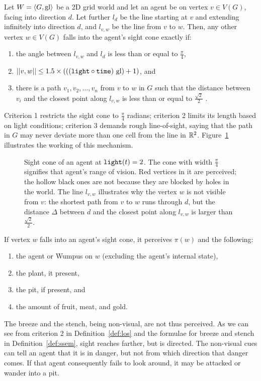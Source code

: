 \begin{definition}
	\label{def:los}
	Let $W = \langle G, \mathrm{gl} \rangle$ be a 2D grid world and let an agent be on vertex $v \in V(G)$, facing into direction $d$. Let further $l_d$ be the line starting at $v$ and extending infinitely into direction $d$, and $l_{v,w}$ be the line from $v$ to $w$. Then, any other vertex $w \in V(G)$ falls into the agent's sight cone exactly if:
	\begin{enumerate}
		\item the angle between $l_{v,w}$ and $l_d$ is less than or equal to $ \frac{\pi}{4}$,
		\item $||{v},{w}|| \leq 1.5 \times (((\mathtt{light} \circ \mathtt{time})\ \mathrm{gl}) + 1)$, and
		\item there is a path $v_1, v_2, \dots, v_n$ from $v$ to $w$ in $G$ such that
		the distance between $v_i$ and the closest point along $l_{v,w}$ is less than or equal to $ \frac{\sqrt{2}}{2}$ .
	\end{enumerate}
\end{definition}

Criterion 1 restricts the sight cone to $\frac{\pi}{4}$ radians; criterion 2 limits its length based on light conditions; criterion 3 demands rough line-of-sight, saying that the path in $G$ may never deviate more than one cell from the line in $\mathbb{R}^2$. Figure~\ref{fig:los} illustrates the working of this mechanism.
%
\begin{figure}
	\centering
	
	\caption{Sight cone of an agent at $\mathtt{light}(t) = 2$. The cone with width $\frac{\pi}{4}$ signifies that agent's range of vision. Red vertices in it are perceived; the hollow black ones are not because they are blocked by holes in the world. The line $l_{v,w}$ illustrates why the vertex $w$ is not visible from $v$: the shortest path from $v$ to $w$ runs through $d$, but the distance $\Delta$ between $d$ and the closest point along $l_{v,w}$ is larger than $\frac{\sqrt{2}}{2}$.}
	\label{fig:los}
\end{figure}
%
If vertex $w$ falls into an agent's sight cone, it perceives $\pi(w)$ and the following:
\begin{enumerate}
	\item the agent or Wumpus on $w$ (excluding the agent's internal state),
	\item the plant, it present,
	\item the pit, if present, and
	\item the amount of fruit, meat, and gold.
\end{enumerate}
The breeze and the stench, being non-visual, are not thus perceived. As we can see from criterion 2 in Definition~\ref{def:los} and the formulae for breeze and stench in Definition~\ref{def:ssem}, sight reaches farther, but is directed. The non-visual cues can tell an agent that it is in danger, but not from which direction that danger comes. If that agent consequently fails to look around, it may be attacked or wander into a pit.


